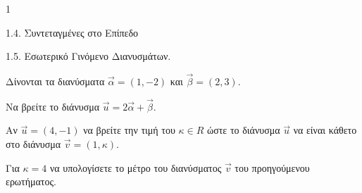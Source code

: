 \begin{ylh}{1}
    \item 1.4. Συντεταγμένες στο Επίπεδο
    \item 1.5. Εσωτερικό Γινόμενο Διανυσμάτων.
\end{ylh}
Δίνονται τα διανύσματα $\vec{\alpha}=(1,-2)$ και $\vec{\beta}=(2,3)$.
\begin{alist}
\item Να βρείτε το διάνυσμα $\vec{u}=2\vec{\alpha}+\vec{\beta}$. 
\item Αν $\vec{u}=(4,-1)$ να βρείτε την τιμή του $\kappa\in R$ ώστε το διάνυσμα $\vec{u}$ να είναι κάθετο στο διάνυσμα $\vec{v}=(1,\kappa)$. 
\item Για $\kappa=4$ να υπολογίσετε το μέτρο του διανύσματος $\vec{v}$ του προηγούμενου ερωτήματος. 
\end{alist}
